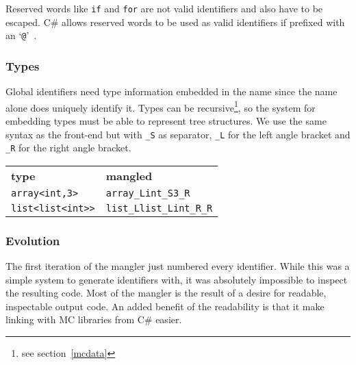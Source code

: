 
Reserved words like \verb|if| and \verb|for| are not valid identifiers and also have to be escaped.  
C\# allows reserved words to be used as valid identifiers if prefixed with an `\verb|@|'~\cite{msdn_identifiers}.

\subsubsection{Types}
Global identifiers need type information embedded in the name since the name alone does uniquely identify it.
Types can be recursive\footnote{see section~\ref{mcdata}}, so the system for embedding types must be able to represent tree structures.
We use the same syntax as the front-end but with \verb|_S| as separator, \verb|_L| for the left angle bracket and \verb|_R| for the right angle bracket.

{\footnotesize
\begin{tabular}{ll}
\textbf{\normalsize type}          & \textbf{\normalsize mangled} \\
\verb|array<int,3>|    & \verb|array_Lint_S3_R| \\
\verb|list<list<int>>| & \verb|list_Llist_Lint_R_R| \\
\end{tabular}
}

\subsubsection{Evolution}
The first iteration of the mangler just numbered every identifier.
While this was a simple system to generate identifiers with, it was absolutely impossible to inspect the resulting code.
Most of the mangler is the result of a desire for readable, inspectable output code.
An added benefit of the readability is that it make linking with MC libraries from C\# easier.

